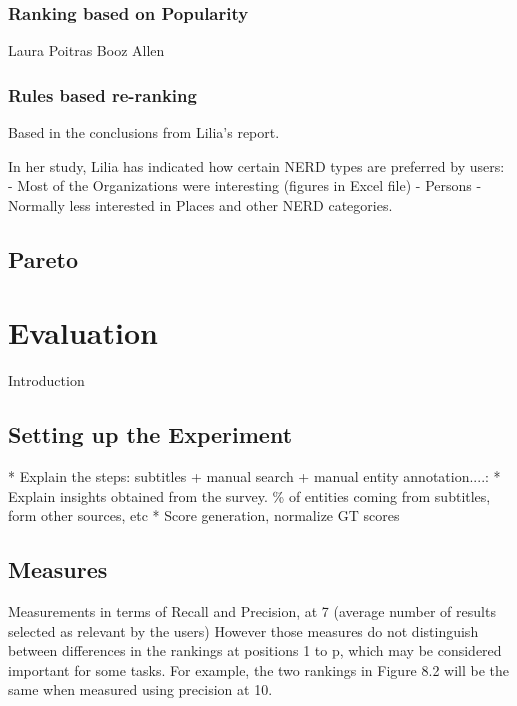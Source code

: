 \documentclass{llncs}
\begin{document}
\subsubsection{Ranking based on Popularity}
Laura Poitras
Booz Allen


\subsubsection{Rules based re-ranking}
Based in the conclusions from Lilia's report. 

In her study, Lilia has indicated how certain NERD types are preferred by users:
- Most of the Organizations were interesting (figures in Excel file)
- Persons 
- Normally less interested in Places and other NERD categories.


\subsection{Pareto}


\section{Evaluation}
\label{sec:Evaluation}

Introduction

\subsection{Setting up the Experiment}
\label{sec:settingUp}


* Explain the steps: subtitles + manual search + manual  entity annotation....:
* Explain insights obtained from the survey. \% of entities coming from subtitles, form other sources, etc
* Score generation, normalize GT scores

\subsection{Measures}
 
Measurements in terms of Recall and Precision, at 7 (average number of results selected as relevant by the users)
However those measures do not distinguish between differences in the rankings at positions 1 to p, which may be considered important for some tasks. For example, the two rankings in Figure 8.2 will be the same when measured using precision at 10. 
 
\end{document}
